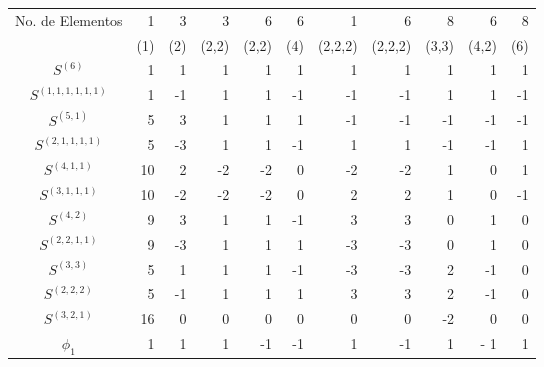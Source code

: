 \documentclass[12pt]{book}
\theoremstyle{definition}
\newcounter{in}
\begin{document}
\begin{tabular}{c |r r r r r r r r r r}
No. de Elementos  & 1 & 3 & 3 & 6 & 6 & 1 & 6 & 8 & 6 & 8 \\
 &(1)& (2) & (2,2) & (2,2) & (4)& (2,2,2) & (2,2,2) & (3,3) & (4,2) & (6)\\
    \hline
  $S^{{(6)}}$         & 1 & 1  & 1  & 1 & 1 &1  & 1 & 1 & 1 & 1 \\
  $S^{{(1,1,1,1,1,1)}}$ & 1 & -1 & 1  & 1 & -1&-1 &-1 & 1 & 1 & -1 \\
  $S^{{(5,1)}}$       & 5 & 3  & 1  & 1 & 1 &-1 &-1 &-1 &-1 & -1 \\
  $S^{{(2,1,1,1,1)}}$  & 5 & -3 &  1 & 1 &-1 & 1 & 1 &-1  &-1 & 1 \\
  $S^{{(4,1,1)}}$     & 10& 2  & -2 & -2& 0 &-2 &-2 & 1  & 0 & 1 \\
  $S^{{(3,1,1,1)}}$    & 10&-2  & -2 &-2 & 0 & 2 & 2 & 1 & 0 & -1 \\
  $S^{{(4,2)}}$       & 9 & 3  & 1  & 1 & -1& 3 & 3 & 0 & 1 &  0 \\
  $S^{{(2,2,1,1)}}$    & 9 & -3 & 1  & 1 & 1 &-3 &-3 & 0 & 1 &  0 \\
  $S^{{(3,3)}}$       & 5 & 1  & 1  & 1 &-1 &-3 & -3& 2 &-1 &  0 \\
  $S^{{(2,2,2)}}$     & 5  & -1& 1  & 1 & 1 & 3 & 3 & 2 & -1 & 0 \\
  $S^{{(3,2,1)}}$     & 16 & 0 & 0  & 0 & 0 & 0 & 0 & -2 & 0 & 0 \\
  \hline
  $\phi_{1}$ & 1 & 1 & 1 & -1 & -1 & 1 &-1 & 1 &- 1 & 1  \\
\end{tabular}


% 
% 

\printindex
\end{document}
